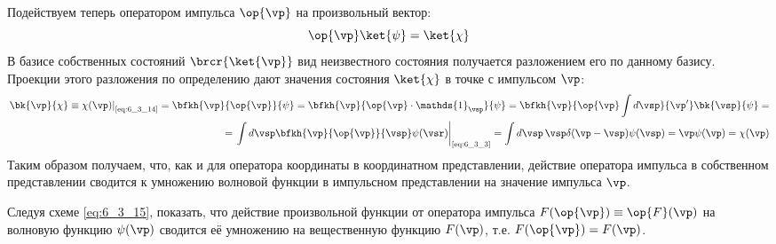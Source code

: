 Подействуем теперь оператором импульса $\op{\vp}$ на произвольный вектор:
\begin{equation}
\label{eq:6_3_14}
\op{\vp} \ket{\psi} = \ket{\chi}
\end{equation}%
%
В базисе собственных состояний $\brcr{\ket{\vp}}$ вид неизвестного состояния получается разложением его по данному базису. Проекции этого разложения по определению дают значения состояния $\ket{\chi}$ в точке с импульсом $\vp$:%
%
\begin{equation}
\label{eq:6_3_15}
\begin{split}
	\left.\bk{\vp}{\chi} \equiv \chi(\vp)\right|_{\text{\eqref{eq:6_3_14}}} =
	\bfkh{\vp}{\op{\vp}}{\psi} = 
	\bfkh{\vp}{\op{\vp} \cdot \mathds{1}_{\vsp}}{\psi} =
	\bfkh{\vp}{\op{\vp}\int d\vsp}{\vp'} \bk{\vsp}{\psi} = \\ =
	\left.\int d\vsp \bfkh{\vp}{\op{\vp}}{\vsp} \psi(\vsr) \right|_{\text{\eqref{eq:6_3_3}}} =
	\int d\vsp \, \vsp \delta(\vp - \vsp) \psi(\vsp) = \vp \psi(\vp) = \chi(\vp)
\end{split}
\end{equation}%
%
Таким образом получаем, что, как и для оператора координаты в координатном представлении, действие оператора импульса в собственном представлении сводится к умножению волновой функции в импульсном представлении на значение импульса $\vp$.

\begin{excr}
\label{excr2}
Следуя схеме \eqref{eq:6_3_15}, показать, что действие произвольной функции от оператора импульса $F(\op{\vp}) \equiv \op{F}(\vp)$ на волновую функцию $\psi(\vp)$ сводится её умножению на вещественную функцию $F(\vp)$, т.е. $F(\op{\vp})=F(\vp)$.
\end{excr}

